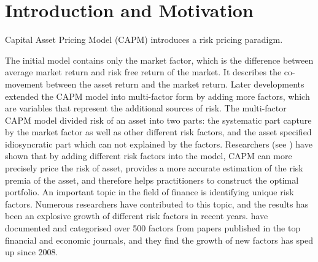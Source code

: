 \chapter{Introduction and Motivation}
Capital Asset Pricing Model (CAPM) \cite{Sharpe1964, Lintner1965, Black1972} introduces a risk pricing paradigm.

The initial model contains only the market factor, which is the difference between average market return and risk free return of the market.
It describes the co-movement between the asset return and the market return.
Later developments extended the CAPM model into multi-factor form by adding more factors, which are variables that represent the additional  sources of risk.
The multi-factor CAPM model divided risk of an asset into two parts: the systematic part capture by the market factor as well as other different risk factors, and the asset specified idiosyncratic part which can not explained by the factors.
Researchers (see ) have shown that by adding different risk factors into the model, CAPM can more precisely price the risk of asset,  provides a more accurate estimation of the risk premia of the asset, and therefore helps practitioners to construct the optimal portfolio.
An important topic in the field of finance is identifying unique risk factors.
Numerous researchers have contributed to this topic, and the results has been an explosive growth of different risk factors in recent years.
  have documented and categorised over 500 factors from papers published in the top financial and economic journals, and they find the growth of new factors has sped up since 2008. 
 
